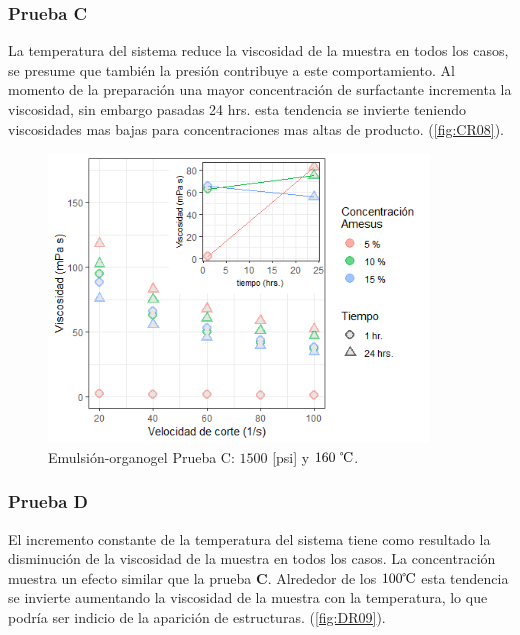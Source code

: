     \subsubsection{Prueba C}
    La temperatura del sistema reduce la viscosidad de la muestra en todos los casos, se presume que también la presión contribuye a este comportamiento. Al momento de la preparación una mayor concentración de surfactante incrementa la viscosidad, sin embargo pasadas 24 hrs. esta tendencia se invierte teniendo viscosidades mas bajas para concentraciones mas altas de producto. (\autoref{fig:CR08}).
    
    \begin{figure}[h]
        \centering
        \includegraphics[width=0.9\textwidth]{R_plot/Rplot08.png}
        \caption[Prueba C emulsión organogel]{Emulsión-organogel Prueba C: $1500$ [psi] y $160~\celsius$.}
        \label{fig:CR08}
    \end{figure}

    \subsubsection{Prueba D}
    El incremento constante de la temperatura del sistema tiene como resultado la disminución de la viscosidad de la muestra en todos los casos. La concentración muestra un efecto similar que la prueba \textbf{C}. Alrededor de los $100 \celsius$ esta tendencia se invierte aumentando la viscosidad de la muestra con la temperatura, lo que podría ser indicio de la aparición de estructuras. (\autoref{fig:DR09}).
    

